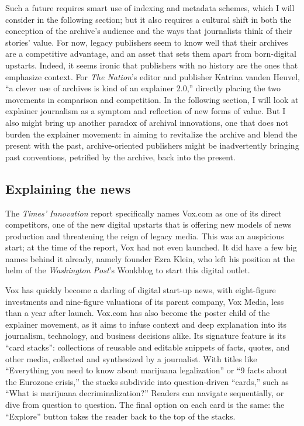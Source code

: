 Such a future requires smart use of indexing and metadata schemes, which I will consider in the following section; but it also requires a cultural shift in both the conception of the archive's audience and the ways that journalists think of their stories' value. For now, legacy publishers seem to know well that their archives are a competitive advantage, and an asset that sets them apart from born-digital upstarts. Indeed, it seems ironic that publishers with no history are the ones that emphasize context. For \emph{The Nation}'s editor and publisher Katrina vanden Heuvel, ``a clever use of archives is kind of an explainer 2.0,'' directly placing the two movements in comparison and competition.\autocite{levy_time.com_2014} In the following section, I will look at explainer journalism as a symptom and reflection of new forms of value. But I also might bring up another paradox of archival innovations, one that does not burden the explainer movement: in aiming to revitalize the archive and blend the present with the past, archive-oriented publishers might be inadvertently bringing past conventions, petrified by the archive, back into the present.

\subsection{Explaining the news}

The \emph{Times'} \emph{Innovation} report specifically names Vox.com as one of its direct competitors, one of the new digital upstarts that is offering new models of news production and threatening the reign of legacy media. This was an auspicious start; at the time of the report, Vox had not even launched. It did have a few big names behind it already, namely founder Ezra Klein, who left his position at the helm of the \emph{Washington Post}'s Wonkblog to start this digital outlet.

Vox has quickly become a darling of digital start-up news, with eight-figure investments and nine-figure valuations of its parent company, Vox Media, less than a year after launch. Vox.com has also become the poster child of the explainer movement, as it aims to infuse context and deep explanation into its journalism, technology, and business decisions alike. Its signature feature is its ``card stacks'': collections of reusable and editable snippets of facts, quotes, and other media, collected and synthesized by a journalist. With titles like ``Everything you need to know about marijuana legalization'' or ``9 facts about the Eurozone crisis,'' the stacks subdivide into question-driven ``cards,'' such as ``What is marijuana decriminalization?'' Readers can navigate sequentially, or dive from question to question. The final option on each card is the same: the ``Explore'' button takes the reader back to the top of the stacks.

